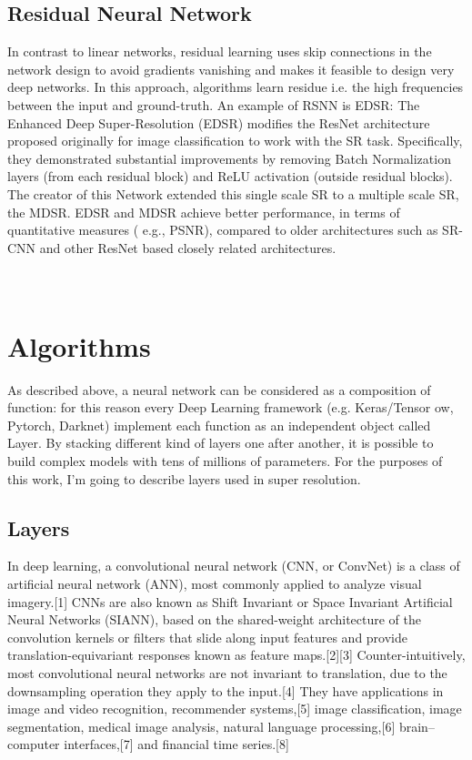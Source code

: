 \documentclass[a4paper, 10pt]{book}
\begin{document}
\subsection{Residual Neural Network}
In contrast to linear networks, residual learning uses skip
connections in the network design to avoid gradients vanishing and makes it feasible to design very deep networks.
In this approach, algorithms learn residue i.e. the high frequencies between the input and ground-truth. 
An example of RSNN is EDSR:  The Enhanced Deep Super-Resolution (EDSR) modifies the ResNet architecture  proposed originally for image classification to work with the SR task. Specifically, they demonstrated substantial improvements by removing Batch Normalization layers (from each residual block) and ReLU activation (outside residual blocks).
The creator of this Network extended this single scale SR to a multiple scale SR, the MDSR.
EDSR and MDSR achieve better performance, in terms of quantitative measures ( e.g., PSNR), compared to older architectures such as SR-CNN and other ResNet based closely related architectures.
\\
\\
\\

\section{Algorithms}
As described above, a neural network can be considered as a composition of function:
 for this reason every Deep Learning framework (e.g. Keras/Tensor ow, Pytorch, Darknet)
 implement each function as an independent object called Layer.
 By stacking different kind of layers one after another, it is possible to build complex
 models with tens of millions of parameters. For the purposes of this work, I'm going
 to describe layers used in super resolution.

\subsection{Layers}
In deep learning, a convolutional neural network (CNN, or ConvNet) is a class of artificial neural network (ANN), most commonly applied to analyze visual imagery.[1]
 CNNs are also known as Shift Invariant or Space Invariant Artificial Neural Networks (SIANN), based on the shared-weight architecture of the convolution kernels  or filters that slide along input features and provide translation-equivariant responses known as feature maps.[2][3]
 Counter-intuitively, most convolutional neural networks are not invariant to translation, due to the downsampling operation they apply to the input.[4] 
 They have applications in image and video recognition, recommender systems,[5] image classification, image segmentation, medical image analysis, natural language processing,[6] 
 brain–computer interfaces,[7] and financial time series.[8]
\end{document}
